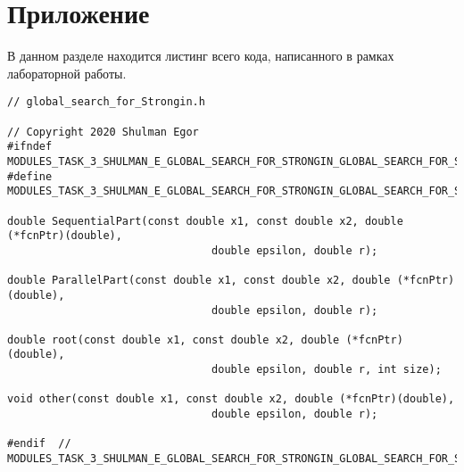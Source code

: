 \documentclass{report}
\begin{document}
\section*{Приложение}
В данном разделе находится листинг всего кода, написанного в рамках лабораторной работы.
\begin{lstlisting}
// global_search_for_Strongin.h

// Copyright 2020 Shulman Egor
#ifndef MODULES_TASK_3_SHULMAN_E_GLOBAL_SEARCH_FOR_STRONGIN_GLOBAL_SEARCH_FOR_STRONGIN_H_
#define MODULES_TASK_3_SHULMAN_E_GLOBAL_SEARCH_FOR_STRONGIN_GLOBAL_SEARCH_FOR_STRONGIN_H_

double SequentialPart(const double x1, const double x2, double (*fcnPtr)(double),
                                double epsilon, double r);

double ParallelPart(const double x1, const double x2, double (*fcnPtr)(double),
                                double epsilon, double r);

double root(const double x1, const double x2, double (*fcnPtr)(double),
                                double epsilon, double r, int size);

void other(const double x1, const double x2, double (*fcnPtr)(double),
                                double epsilon, double r);

#endif  // MODULES_TASK_3_SHULMAN_E_GLOBAL_SEARCH_FOR_STRONGIN_GLOBAL_SEARCH_FOR_STRONGIN_H_
\end{lstlisting}
\newpage
\end{document}
